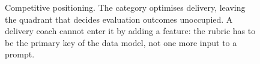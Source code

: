 \begin{figure}[htbp]
\caption{Competitive positioning. The category optimises delivery, leaving the
quadrant that decides evaluation outcomes unoccupied. A delivery coach cannot
enter it by adding a feature: the rubric has to be the primary key of the data
model, not one more input to a prompt.}
\label{fig:compete}
\end{figure}
